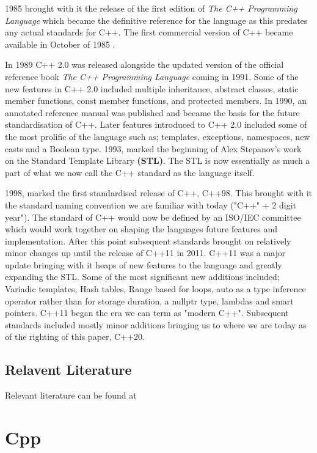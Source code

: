 \documentclass[conference, a4paper]{IEEEtran}
\begin{document}
1985 brought with it the release of the first edition of \textit{The C++ Programming Language} \cite{cpp_1985} which became the definitive reference for the language as this predates any actual standards for C++. The first commercial version of C++ became available in October of 1985 \cite{cppinvention}.

In 1989 C++ 2.0 was released alongside the updated version of the official reference book \textit{The C++ Programming Language} coming in 1991. Some of the new features in C++ 2.0 included multiple inheritance, abstract classes, static member functions, const member functions, and protected members. In 1990, an annotated reference manual was published and became the basis for the future standardisation of C++. Later features introduced to C++ 2.0 included some of the most prolific of the language such as; templates, exceptions, namespaces, new casts and a Boolean type. 1993, marked the beginning of Alex Stepanov's work on the Standard Template Library \textbf{(STL)}. The STL is now essentially as much a part of what we now call the C++ standard as the language itself. 

1998, marked the first standardised release of C++, C++98. This brought with it the standard naming convention we are familiar with today ("C++" + 2 digit year"). The standard of C++ would now be defined by an ISO/IEC committee which would work together on shaping the languages future features and implementation. After this point subsequent standards brought on relatively minor changes up until the release of C++11 in 2011. C++11 was a major update bringing with it heaps of new features to the language and greatly expanding the STL. Some of the most significant new additions included; Variadic templates, Hash tables, Range based for loops, auto as a type inference operator rather than for storage duration, a nullptr type, lambdas and smart pointers. C++11 began the era we can term as "modern C++". Subsequent standards included mostly minor additions bringing us to where we are today as of the righting of this paper, C++20.


\subsection{Relavent Literature}
Relevant literature can be found at \cite{cpphome,cpp_1985,cpphistory,cppoverview,cppevolving,alexandrescu2001modern}

\section{Cpp}
\end{document}
